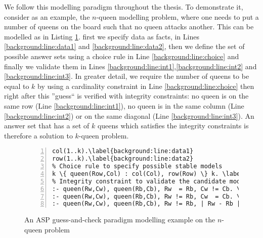 We follow this modelling paradigm throughout the thesis. To demonstrate it, consider as an example, the $n$-queen modelling problem, where one needs to put a number of queens on the board such that no queen attacks another. This can be modelled as in Listing \ref{lst:n_queens_example_modelling}. first we specify data as facts, in Lines \ref{background:line:data1} and \ref{background:line:data2}, then we define the set of possible answer sets using a choice rule in Line \ref{background:line:choice} and finally we validate them in Lines \ref{background:line:int1},\ref{background:line:int2} and \ref{background:line:int3}. 
\pubrev
In greater detail, we require the number of queens to be equal to $k$ by using a cardinality constraint in Line \ref{background:line:choice} then right after this ''guess`` is verified with integrity constraints: no queen is on the same row (Line \ref{background:line:int1}), no queen is in the same column (Line \ref{background:line:int2}) or on the same diagonal (Line \ref{background:line:int3}). An answer set that has a set of $k$ queens which satisfies the integrity constraints is therefore a solution to $k$-queen problem.
\pubrevend

\begin{figure}[H] 
\renewcommand\figurename{Listing}
\begin{Verbatim}[fontsize=\small,numbers=left,xleftmargin=0mm,commandchars=\\\{\},frame=single]
% Data specifying the board
col(1..k).\label{background:line:data1}
row(1..k).\label{background:line:data2}
% Choice rule to specify possible stable models
k \{ queen(Row,Col) : col(Col), row(Row) \} k. \label{background:line:choice}
% Integrity constraint to validate the candidate models
:- queen(Rw,Cw), queen(Rb,Cb), Rw  = Rb, Cw != Cb. \label{background:line:int1}
:- queen(Rw,Cw), queen(Rb,Cb), Rw != Rb, Cw  = Cb. \label{background:line:int2}
:- queen(Rw,Cw), queen(Rb,Cb), Rw != Rb, | Rw - Rb | = | Cw - Cb |.\label{background:line:int3}
\end{Verbatim}
\caption{An ASP guess-and-check paradigm modelling example on the $n$-queen problem}
\label{lst:n_queens_example_modelling}
\end{figure}


